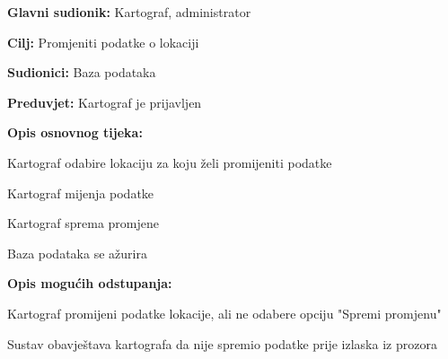 				
					\noindent {}
					\begin{packed_item}
						
						\item \textbf{Glavni sudionik: }Kartograf, administrator
						\item  \textbf{Cilj:} Promjeniti podatke o lokaciji
						\item  \textbf{Sudionici:} Baza podataka
						\item  \textbf{Preduvjet:} Kartograf je prijavljen
						\item  \textbf{Opis osnovnog tijeka:}
						
						\item[] \begin{packed_enum}
							
							\item Kartograf odabire lokaciju za koju želi promijeniti podatke
							\item Kartograf mijenja podatke
							\item Kartograf sprema promjene
							\item Baza podataka se ažurira
						\end{packed_enum}
						
						\item  \textbf{Opis mogućih odstupanja:}
						
						\item[] \begin{packed_item}
							
							\item[3.a] Kartograf promijeni podatke lokacije, ali ne odabere opciju "Spremi promjenu"
							\item[] \begin{packed_enum}
								\item Sustav obavještava kartografa da nije spremio podatke prije izlaska iz prozora
							\end{packed_enum}
						\end{packed_item}
					\end{packed_item}
				
